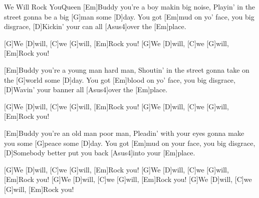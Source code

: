\documentclass[../main.tex]{subfiles}
\begin{document}
\begin{song}{We Will Rock You}{Queen}{}
[Em]Buddy you're a boy makin big noise,
Playin' in the street gonna be a big [G]man some [D]day.
You got [Em]mud on yo' face, you big disgrace,
[D]Kickin' your can all [Asus4]over the [Em]place. \hh{}

[G]We [D]will,  [C]we [G]will, [Em]Rock you!
[G]We [D]will,  [C]we [G]will, [Em]Rock you!

[Em]Buddy you're a young man hard man,
Shoutin' in the street gonna take on the [G]world some [D]day.
You got [Em]blood on yo' face, you big disgrace,
[D]Wavin' your banner all [Asus4]over the [Em]place.

[G]We [D]will,  [C]we [G]will, [Em]Rock you! \hh{}
[G]We [D]will,  [C]we [G]will, [Em]Rock you!

[Em]Buddy you're an old man poor man,
Pleadin' with your eyes gonna make you some [G]peace some [D]day.
You got [Em]mud on your face, you big disgrace,
[D]Somebody better put you back [Asus4]into your [Em]place.

[G]We [D]will,  [C]we [G]will, [Em]Rock you! \hh{}
[G]We [D]will,  [C]we [G]will, [Em]Rock you! \hh{}
[G]We [D]will,  [C]we [G]will, [Em]Rock you!
[G]We [D]will,  [C]we [G]will, [Em]Rock you!
\end{song}
\end{document}
